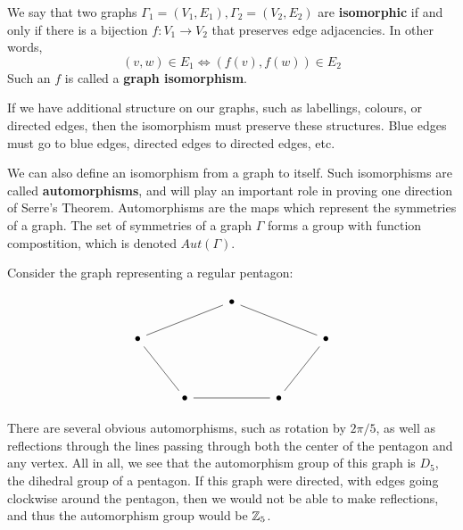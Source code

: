 \begin{defn}
    We say that two graphs $\Gamma_1 = (V_1,E_1), \Gamma_2 = (V_2,E_2)$ are \textbf{isomorphic} if and only if there is a bijection $f: V_1 \to V_2$ that preserves edge adjacencies. In other words, 
    \[ (v,w) \in E_1 \iff (f(v),f(w)) \in E_2 \]
    Such an $f$ is called a \textbf{graph isomorphism}.
\end{defn}

If we have additional structure on our graphs, such as labellings, colours, or directed edges, then the isomorphism must preserve these structures. Blue edges must go to blue edges, directed edges to directed edges, etc. 

We can also define an isomorphism from a graph to itself. Such isomorphisms are called \textbf{automorphisms}, and will play an important role in proving one direction of Serre's Theorem. Automorphisms are the maps which represent the symmetries of a graph. The set of symmetries of a graph $\Gamma$ forms a group with function compostition, which is denoted $Aut(\Gamma)$. 

\begin{example}
    Consider the graph representing a regular pentagon:

    \[\begin{tikzcd}
        && \bullet \\
        \bullet &&&& \bullet \\
        \\
        & \bullet && \bullet
        \arrow[no head, from=1-3, to=2-1]
        \arrow[no head, from=2-1, to=4-2]
        \arrow[no head, from=2-5, to=1-3]
        \arrow[no head, from=4-2, to=4-4]
        \arrow[no head, from=4-4, to=2-5]
    \end{tikzcd}\]

    There are several obvious automorphisms, such as rotation by $2\pi/5$, as well as reflections through the lines passing through both the center of the pentagon and any vertex. All in all, we see that the automorphism group of this graph is $D_5$, the dihedral group of a pentagon. If this graph were directed, with edges going clockwise around the pentagon, then we would not be able to make reflections, and thus the automorphism group would be $\mathbb{Z}_5$. 
\end{example}

